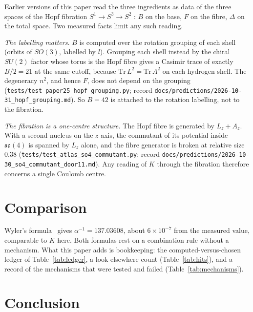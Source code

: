 \documentclass[aps,prl,twocolumn,superscriptaddress]{revtex4-2}
\begin{document}
Earlier versions of this paper read the three ingredients as data of
the three spaces of the Hopf fibration $S^1 \to S^3 \to S^2$
\cite{hopf1931}: $B$ on the base, $F$ on the fibre, $\Delta$ on the total
space. Two measured facts limit any such reading.

\emph{The labelling matters.} $B$ is computed over the rotation
grouping of each shell (orbits of $SO(3)$, labelled by $l$). Grouping
each shell instead by the chiral $SU(2)$ factor whose torus is the
Hopf fibre gives a Casimir trace of exactly $B/2 = 21$ at the same
cutoff, because $\mathrm{Tr}\,L^2 = \mathrm{Tr}\,A^2$ on each hydrogen
shell. The degeneracy $n^2$, and hence $F$, does not depend on the
grouping (\texttt{tests/test\_paper25\_hopf\_grouping.py}; record
\texttt{docs/predictions/2026-10-31\_hopf\_grouping.md}). So $B = 42$ is
attached to the rotation labelling, not to the fibration.

\emph{The fibration is a one-centre structure.} The Hopf fibre is
generated by $L_z + A_z$. With a second nucleus on the $z$ axis, the
commutant of its potential inside $\mathfrak{so}(4)$ is spanned by
$L_z$ alone, and the fibre generator is broken at relative size $0.38$
(\texttt{tests/test\_atlas\_so4\_commutant.py}; record
\texttt{docs/predictions/}\linebreak[0]\texttt{2026-10-30\_so4\_commutant\_door11.md}). Any
reading of $K$ through the fibration therefore concerns a single
Coulomb centre.


\section{Comparison}\label{sec:comparison}

Wyler's formula~\cite{wyler1969} gives $\alpha^{-1} = 137.03608$, about
$6\times10^{-7}$ from the measured value, comparable to $K$ here. Both
formulas rest on a combination rule without a mechanism. What this
paper adds is bookkeeping: the computed-versus-chosen ledger of
Table~\ref{tab:ledger}, a look-elsewhere count (Table~\ref{tab:hits}),
and a record of the mechanisms that were tested and failed
(Table~\ref{tab:mechanisms}).


\section{Conclusion}
\end{document}
